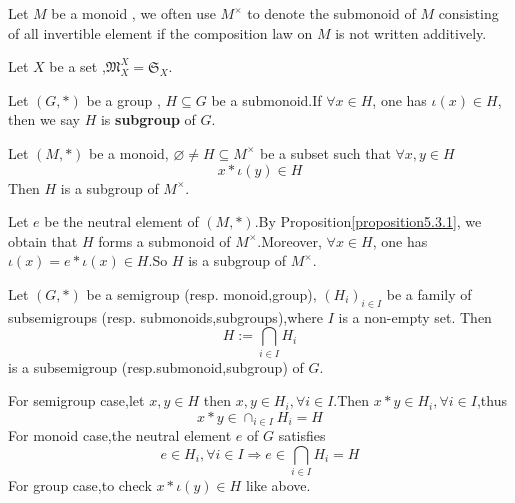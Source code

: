 \documentclass{book}
\numberwithin{equation}{section}
\begin{document}
\begin{notationenv}
    Let $M$ be a monoid , we often use $M^\times$ to denote the submonoid of $M$ consisting of all invertible element if the composition law on $M$ is not written additively.
\end{notationenv}
\begin{exampleenv}
    Let $X$ be a set ,$\mathfrak{M} _X^X=\mathfrak{S} _X$.
\end{exampleenv}
\begin{definitionenv}
    Let $(G,*)$ be a group , $H\subseteq G$ be a submonoid.If $\forall x\in H$, one has $\iota(x)\in H$, then we say $H$ is \textbf{subgroup} of $G$.
\end{definitionenv}
\begin{propositionenv}
    Let $(M,*)$ be a monoid, $\varnothing \not=H\subseteq M^\times$ be a subset such that $\forall x,y \in H$
    $$x*\iota(y)\in H$$
    Then $H$ is a subgroup of $M^\times$.
\end{propositionenv}
\begin{proofenv}
    Let $e$ be the neutral element of $(M,*)$.By Proposition\ref{proposition5.3.1}, we obtain that $H$ forms a submonoid of $M^\times$.Moreover, $\forall x \in H$, one has $\iota(x)=e*\iota(x)\in H$.So $H$ is a subgroup of $M^\times$.
\end{proofenv}
\begin{propositionenv}
    Let $(G,*)$ be a semigroup (resp. monoid,group), $(H_i)_{i\in I}$ be a family of subsemigroups (resp. submonoids,subgroups),where $I$ is a non-empty set. Then 
    $$H:=\bigcap_{i\in I}H_i$$
    is a subsemigroup (resp.submonoid,subgroup) of $G$.
\end{propositionenv}
\begin{proofenv}
    \quad\newline
    For semigroup case,let $x,y\in H$ then $x,y\in H_i,\forall i \in I$.Then $x*y\in H_i,\forall i \in I $,thus 
    $$x*y\in \cap_{i\in I}H_i=H$$
    For monoid case,the neutral element $e$ of $G$ satisfies
    $$e \in H_i,\forall i \in I\Rightarrow e\in \bigcap_{i\in I}H_i=H$$
    For group case,to check $x*\iota(y)\in H$ like above.
\end{proofenv}
\end{document}
